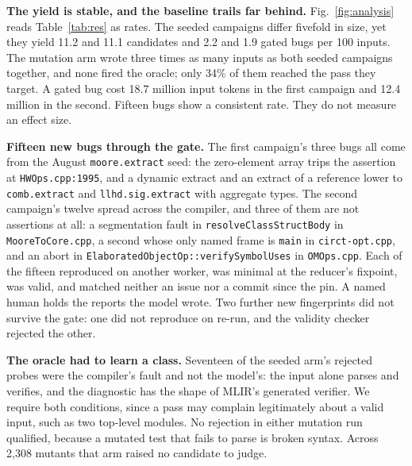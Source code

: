 \documentclass[conference]{IEEEtran}
\begin{document}
\textbf{The yield is stable, and the baseline trails far behind.}
Fig.~\ref{fig:analysis} reads Table~\ref{tab:res} as rates. The seeded
campaigns differ fivefold in size, yet they yield 11.2 and 11.1 candidates and
2.2 and 1.9 gated bugs per 100 inputs. The mutation arm wrote three times as
many inputs as both seeded campaigns together, and none fired the oracle; only
34\% of them reached the pass they target. A
gated bug cost 18.7 million input tokens in the first campaign and 12.4 million
in the second. %
Fifteen bugs show a consistent rate. They do not measure an effect size.

\textbf{Fifteen new bugs through the gate.} The first campaign's three bugs all
come from the August \texttt{moore.extract} seed: the zero-element array trips the assertion at \texttt{HWOps.cpp:1995},
and a dynamic extract and an extract of a reference lower to
\texttt{comb.extract} and \texttt{llhd.sig.extract} with aggregate types. %
The second campaign's twelve spread across the compiler, and three of them are
not assertions at all: a segmentation fault in \texttt{resolveClassStructBody}
in \texttt{MooreToCore.cpp}, a second whose only named frame is \texttt{main}
in \texttt{circt-opt.cpp}, and an abort in
\texttt{ElaboratedObjectOp::}\allowbreak\texttt{verifySymbolUses} in
\texttt{OMOps.cpp}. %
Each of the fifteen reproduced on another worker, was minimal at the reducer's
fixpoint, was valid, and matched neither an issue nor a commit since the pin.
A named human holds the reports the model wrote. %
Two further new fingerprints did not survive the gate: one did not reproduce on
re-run, and the validity checker rejected the other. %

\textbf{The oracle had to learn a class.} Seventeen of the seeded arm's
rejected probes were the compiler's fault and not the model's: the input alone
parses and verifies, and the diagnostic has the shape of MLIR's generated
verifier. We require both conditions, since a pass may complain legitimately
about a valid input, such as two top-level modules. %
No rejection in either mutation run qualified, because a mutated test that fails
to parse is broken syntax. Across 2{,}308 mutants that arm raised no candidate
to judge. %
\end{document}
